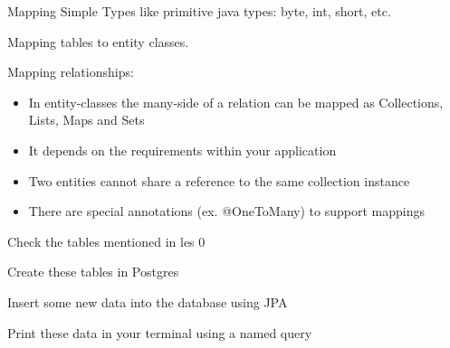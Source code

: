 \documentclass{beamer}
\begin{document}
\begin{slide}{
\item Mapping Simple Types like primitive java types: byte, int, short, etc.
\item Mapping tables to entity classes.
\item Mapping relationships: 
\begin{itemize}
\item In entity-classes the many-side of a relation can be mapped as Collections, Lists, Maps and Sets
\item It depends on the requirements within your application
\item Two entities cannot share a reference to the same collection instance  
\item There are special annotations (ex. @OneToMany) to support mappings
\end{itemize} 
}
\end{slide}  

\begin{slide}{
\item Check the tables mentioned in les 0
\item Create these tables in Postgres
\item Insert some new data into the database using JPA	
\item Print these data in your terminal using a named query 
}\end{slide}
\end{document}
